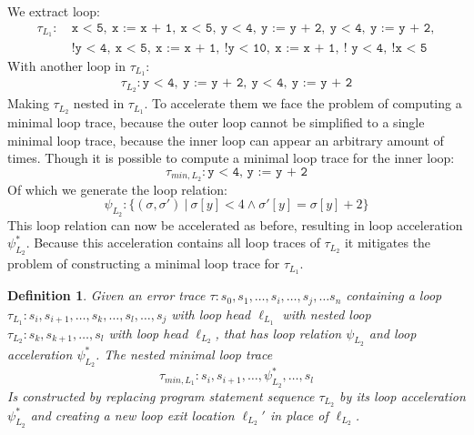 \documentclass{article}
\newcommand{\loc}[1]{\ensuremath{\ell_{#1}}}
\newtheorem{mydef}{Definition}
\begin{document}
We extract loop:
\begin{align*}
	\tau_{L_1}:\  & \texttt{x < 5},\ \texttt{x := x + 1},\ \texttt{x < 5},\ \texttt{y < 4},\ \texttt{y := y + 2},\ \texttt{y < 4},\ \texttt{y := y + 2}, \\ &\texttt{!y < 4},\
	\texttt{x < 5},\ \texttt{x := x + 1},\ \texttt{!y < 10},\ \texttt{x := x + 1},\ \texttt{! y < 4},\ \texttt{!x < 5}
\end{align*}
With another loop in $\tau_{L_1}$:
\begin{align*}
	\tau_{L_2}: \texttt{y < 4},\ \texttt{y := y + 2},\ \texttt{y < 4},\ \texttt{y := y + 2}
\end{align*}
Making $\tau_{L_2}$ nested in $\tau_{L_1}$. To accelerate them we face the problem of computing a minimal loop trace, because the outer loop cannot be simplified to a single minimal loop trace, because the inner loop can appear an arbitrary amount of times. Though it is possible to compute a minimal loop trace for the inner loop:
\begin{equation*}
	\tau_{min, {L_2}}: \texttt{y < 4,\ y := y + 2}
\end{equation*}
Of which we generate the loop relation:
\begin{equation*}
	\psi_{L_{2}}: \{(\sigma, \sigma')\ |\ \sigma[y] < 4 \land \sigma'[y] = \sigma[y] + 2 \}
\end{equation*}
This loop relation can now be accelerated as before, resulting in loop acceleration $\psi_{L_{2}}^*$. Because this acceleration contains all loop traces of $\tau_{L_2}$ it mitigates the problem of constructing a minimal loop trace for $\tau_{L_1}$.

\begin{mydef}
	Given an error trace $\tau: s_0, s_1, \ldots, s_i, \ldots, s_j, \ldots s_n$ containing a loop \\ $\tau_{L_1}: s_i, s_{i+1}, \ldots, s_k, \ldots, s_l, \ldots, s_j$ with loop head $\loc{L_1}$ with nested loop $\tau_{L_2}: s_k, s_{k+1}, \ldots, s_l$ with loop head $\loc{L_2}$, that has loop relation $\psi_{L_{2}}$ and loop acceleration $\psi_{L_{2}}^*$. The nested minimal loop trace
	\begin{equation*}
		\tau_{min, {L_1}} : s_i, s_{i+1}, \ldots, \psi_{L_{2}}^*, \ldots, s_l
	\end{equation*}
	Is constructed by replacing program statement sequence $\tau_{L_2}$ by its loop acceleration $\psi_{L_{2}}^*$ and creating a new loop exit location $\loc{L_2}'$ in place of $\loc{L_2}$.
\end{mydef}
\end{document}
